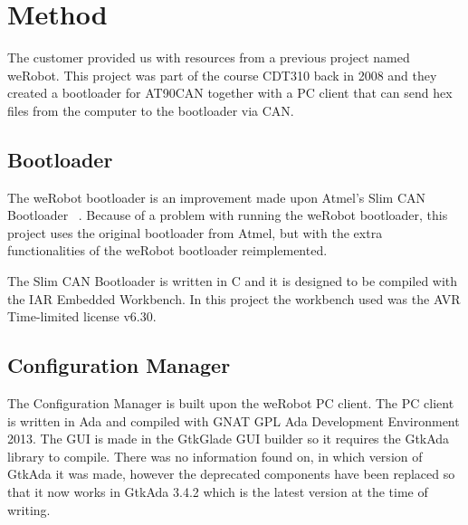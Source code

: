 \section{Method}\label{sec:method}
The customer provided us with resources from a previous project named weRobot. This project was part of the course CDT310 back in 2008 and they created a bootloader for AT90CAN together with a PC client that can send hex files from the computer to the bootloader via CAN.


\subsection{Bootloader}
The weRobot bootloader is an improvement made upon Atmel's Slim CAN Bootloader ~\cite{web:slimbootloader}. Because of a problem with running the weRobot bootloader, this project uses the original bootloader from Atmel, but with the extra functionalities of the weRobot bootloader reimplemented.

The Slim CAN Bootloader is written in C and it is designed to be compiled with the IAR Embedded Workbench. In this project the workbench used was the AVR Time-limited license v6.30.

\subsection{Configuration Manager}
The Configuration Manager is built upon the weRobot PC client. The PC client is written in Ada and compiled with GNAT GPL Ada Development Environment 2013.
The GUI is made in the GtkGlade GUI builder so it requires the GtkAda library to compile. There was no information found on, in which version of GtkAda it was made, however the deprecated components have been replaced so that it now works in GtkAda 3.4.2 which is the latest version at the time of writing.
